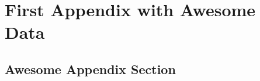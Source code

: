 \chapter{First Appendix with Awesome Data}
\label{appendixA}

\section{Awesome Appendix Section}
\label{appendixA:sec1}



